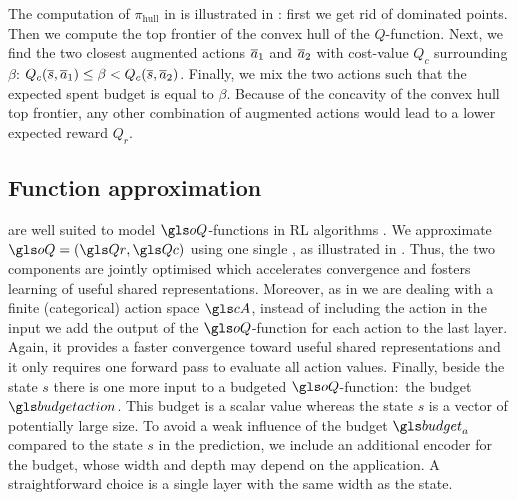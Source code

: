 The computation of $\pi_\text{hull}$ in  is illustrated in : first we get rid of dominated points. Then we compute the top frontier of the convex hull of the $Q$-function. Next, we find the two closest augmented actions $\overline{a}_1$ and $\overline{a}_2$ with cost-value $Q_c$ surrounding $\beta$:  $Q_c(\overline{s},\overline{a}_1)\leq\beta<Q_c(\overline{s},\overline{a}_2)$. Finally, we mix the two actions such that the expected spent budget is equal to $\beta$. Because of the concavity of the convex hull top frontier, any other combination of augmented actions would lead to a lower expected reward $Q_r$. 




\subsection{Function approximation}

 are well suited to model $\oQ$-functions in \gls{RL} algorithms \citep{Mnih2015}. We approximate $\oQ = (\Qr, \Qc)$ using one single , as illustrated in . Thus, the two components are jointly optimised which accelerates convergence and fosters learning of useful shared representations. Moreover, as in \citep{Mnih2015} we are dealing with a finite (categorical) action space $\cA$, instead of including the action in the input we add the output of the $\oQ$-function for each action to the last layer. Again, it provides a faster convergence toward useful shared representations and it only requires one forward pass to evaluate all action values. Finally, beside the state $s$ there is one more input to a budgeted $\oQ$-function:~the budget $\budgetaction$. This budget is a scalar value whereas the state $s$ is a vector of potentially large size. To avoid a weak influence of the budget $\budget_a$ compared to the state $s$ in the prediction, we include an additional encoder for the budget, whose width and depth may depend on the application. A straightforward choice is a single layer with the same width as the state.

